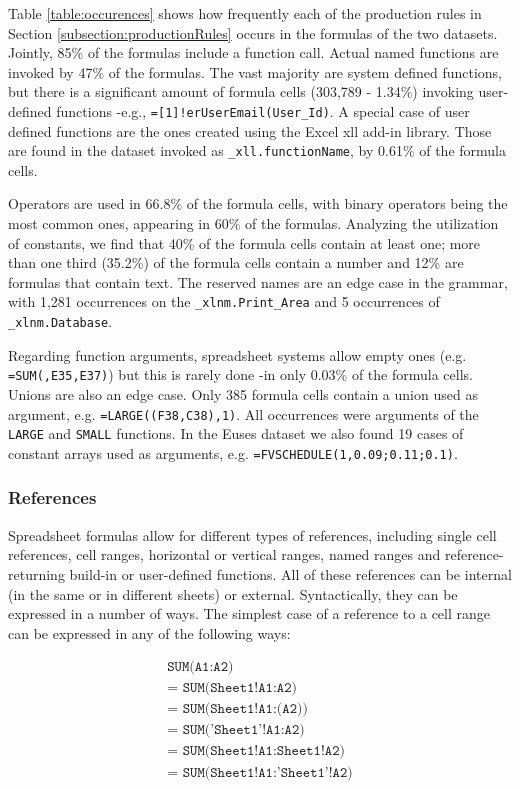 \documentclass[conference]{IEEEtran}
\begin{document}
Table \ref{table:occurences} shows how frequently each of the production rules in Section \ref{subsection:productionRules} occurs in the formulas of the two datasets. Jointly, 85\% of the formulas include a function call. Actual named functions are invoked by 47\% of the formulas. The vast majority are system defined functions, but there is a significant amount of formula cells (303,789 - 1.34\%) invoking user-defined functions -e.g., \texttt{=[1]!erUserEmail(User_Id)}. A special case of user defined functions are the ones created using the Excel xll add-in library. Those are found in the dataset invoked as \texttt{_xll.functionName}, by 0.61\% of the formula cells.

Operators are used in 66.8\% of the formula cells, with binary operators being the most common ones, appearing in 60\% of the formulas. Analyzing the utilization of constants, we find that 40\% of the formula cells contain at least one; more than one third (35.2\%) of the formula cells contain a number and 12\% are formulas that contain text. The reserved names are an edge case in the grammar, with 1,281 occurrences on the \texttt{_xlnm.Print_Area} and 5 occurrences of  \texttt{_xlnm.Database}.

Regarding function arguments, spreadsheet systems allow empty ones (e.g. \texttt{=SUM(,E35,E37)}) but this is rarely done -in only 0.03\% of the formula cells. Unions are also an edge case. Only 385 formula cells contain a union used as argument, e.g. \texttt{=LARGE((F38,C38),1)}. All occurrences were arguments of the \texttt{LARGE} and \texttt{SMALL} functions. In the Euses dataset we also found 19 cases of constant arrays used as arguments, e.g. \texttt{=FVSCHEDULE(1,{0.09;0.11;0.1})}.

\subsubsection{References}

Spreadsheet formulas allow for different types of references, including single cell references, cell ranges, horizontal or vertical ranges, named ranges and reference-returning build-in or user-defined functions. All of these references can be internal (in the same or in different sheets) or external. Syntactically, they can be expressed in a number of ways. The simplest case of a reference to a cell range can be expressed in any of the following ways:

\begin{eqnarray*}
	\texttt{SUM(A1:A2)} \\ 
	\texttt{= SUM(Sheet1!A1:A2)} \\
	\texttt{= SUM(Sheet1!A1:(A2))} \\
	\texttt{= SUM('Sheet1'!A1:A2)} \\
	\texttt{= SUM(Sheet1!A1:Sheet1!A2)} \\
	\texttt{= SUM(Sheet1!A1:'Sheet1'!A2)} \\
\end{eqnarray*}
\end{document}
